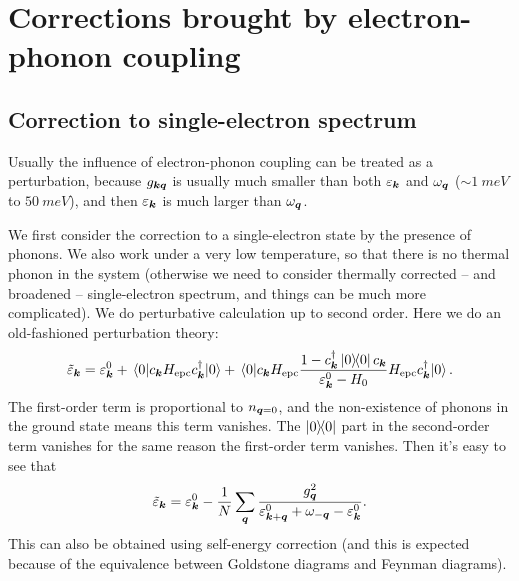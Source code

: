 \documentclass[hyperref, a4paper]{article}
\begin{document}
\section{Corrections brought by electron-phonon coupling}

\subsection{Correction to single-electron spectrum}

Usually the influence of electron-phonon coupling can be treated as a perturbation,
because $g_{\vb*{k} \vb*{q}}$ is usually much smaller than both $\varepsilon_{\vb*{k}}$ and $\omega_{\vb*{q}}$
($\sim \SI{1}{meV}$ to $\SI{50}{meV}$),
and then $\varepsilon_{\vb*{k}}$ is much larger than $\omega_{\vb*{q}}$.

We first consider the correction to a single-electron state 
by the presence of phonons.
We also work under a very low temperature,
so that there is no thermal phonon in the system
(otherwise we need to consider thermally corrected -- and broadened -- 
single-electron spectrum, and things can be much more complicated). 
We do perturbative calculation up to second order.
Here we do an old-fashioned perturbation theory: 
\begin{equation}
    \tilde{\varepsilon}_{\vb*{k}} = \varepsilon_{\vb*{k}}^0 
    + \mel*{0}{c_{\vb*{k}} H_{\text{epc}} c^\dagger_{\vb*{k}}}{0}
    + \mel*{0}{c_{\vb*{k}} H_{\text{epc}} \frac{1 - c^\dagger_{\vb*{k}} \dyad*{0}{0} c_{\vb*{k}}}{\varepsilon^0_{\vb*{k}} - H_0} H_{\text{epc}} c^\dagger_{\vb*{k}} }{0}.
    \label{eq:phonon-perturbation-energy}
\end{equation}
The first-order term is proportional to $n_{\vb*{q} = 0}$,
and the non-existence of phonons in the ground state 
means this term vanishes.
The $\dyad{0}$ part in the second-order term vanishes
for the same reason the first-order term vanishes.
Then it's easy to see that 
\begin{equation}
    \tilde{\varepsilon}_{\vb*{k}} = \varepsilon_{\vb*{k}}^{0} - \frac{1}{N} \sum_{\vb*{q}} \frac{g_{\vb*{q}}^2}{\varepsilon^0_{\vb*{k} + \vb*{q}} + \omega_{-\vb*{q}} - \varepsilon_{\vb*{k}}^0}.
    \label{eq:electron-spectrum-phonon}
\end{equation}
This can also be obtained using self-energy correction 
(and this is expected because of the equivalence 
between Goldstone diagrams and Feynman diagrams).
\end{document}
